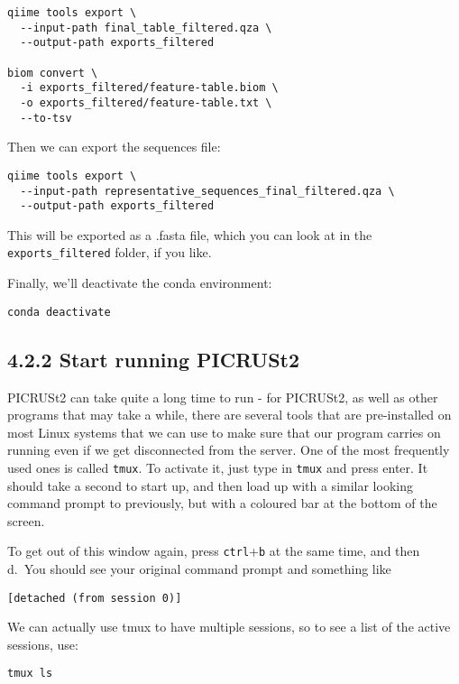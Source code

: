 \documentclass[
]{book}
\begin{document}
\begin{verbatim}
qiime tools export \
  --input-path final_table_filtered.qza \
  --output-path exports_filtered
  
biom convert \
  -i exports_filtered/feature-table.biom \
  -o exports_filtered/feature-table.txt \
  --to-tsv 
\end{verbatim}

Then we can export the sequences file:

\begin{verbatim}
qiime tools export \
  --input-path representative_sequences_final_filtered.qza \
  --output-path exports_filtered
\end{verbatim}

This will be exported as a .fasta file, which you can look at in the \texttt{exports\_filtered} folder, if you like.

Finally, we'll deactivate the conda environment:

\begin{verbatim}
conda deactivate
\end{verbatim}

\subsection{4.2.2 Start running PICRUSt2}\label{start-running-picrust2}

PICRUSt2 can take quite a long time to run - for PICRUSt2, as well as other programs that may take a while, there are several tools that are pre-installed on most Linux systems that we can use to make sure that our program carries on running even if we get disconnected from the server. One of the most frequently used ones is called \texttt{tmux}. To activate it, just type in \texttt{tmux} and press enter. It should take a second to start up, and then load up with a similar looking command prompt to previously, but with a coloured bar at the bottom of the screen.

To get out of this window again, press \texttt{ctrl}+\texttt{b} at the same time, and then d.~You should see your original command prompt and something like

\begin{verbatim}
[detached (from session 0)]
\end{verbatim}

We can actually use tmux to have multiple sessions, so to see a list of the active sessions, use:

\begin{verbatim}
tmux ls
\end{verbatim}
\end{document}
